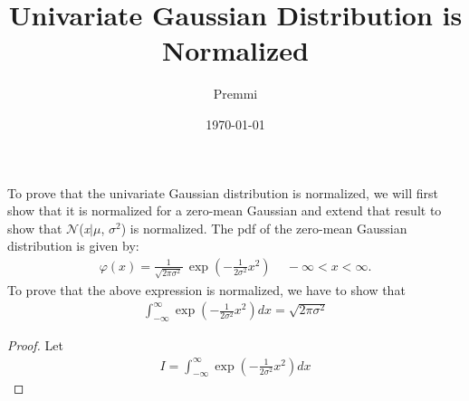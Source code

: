 \documentclass[14pt]{extarticle}
\title{Univariate Gaussian Distribution is Normalized}
\author{Premmi}
\date{\today}
\begin{document}
\maketitle	
\begin{flushleft}    
To prove that the univariate Gaussian distribution is normalized, we will first show that it is normalized for a zero-mean Gaussian and extend that result to show that $\mathcal{N}$(\textit{x}$\mid$$\mu$, $\sigma$$^{2}$) is normalized.		
\newline
\newline
The pdf of the zero-mean Gaussian distribution is given by:			
\begin{align}		
\varphi(x)= \frac{1}{\sqrt{2\pi\sigma^2}}\, \exp\left(-\frac{1}{2\sigma^2}x^2\right)\,\,\,\,\,\,\,-\infty<x<\infty.			
\end{align}
To prove that the above expression is normalized, we have to show that 
\begin{align}
\int_{-\infty}^{\infty} \exp\left(-\frac{1}{2\sigma^2}x^2\right)dx = \sqrt{2\pi\sigma^2}
\end{align}
\begin{proof}
Let
\begin{align}
I = \int_{-\infty}^{\infty} \exp\left(-\frac{1}{2\sigma^2}x^2\right)dx
\end{align}


\end{proof}
\end{flushleft}
\end{document}
